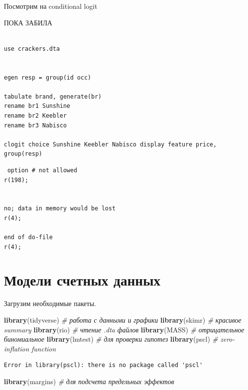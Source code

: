 \documentclass[]{book}
\newenvironment{Shaded}{\begin{snugshade}}{\end{snugshade}}
\newcommand{\CommentTok}[1]{\textcolor[rgb]{0.56,0.35,0.01}{\textit{#1}}}
\newcommand{\KeywordTok}[1]{\textcolor[rgb]{0.13,0.29,0.53}{\textbf{#1}}}
\newcommand{\NormalTok}[1]{#1}
\begin{document}
Посмотрим на conditional logit

ПОКА ЗАБИЛА

\begin{verbatim}

use crackers.dta


egen resp = group(id occ)

tabulate brand, generate(br)
rename br1 Sunshine
rename br2 Keebler
rename br3 Nabisco

clogit choice Sunshine Keebler Nabisco display feature price, group(resp)
\end{verbatim}

\begin{verbatim}
 option # not allowed
r(198);


no; data in memory would be lost
r(4);

end of do-file
r(4);
\end{verbatim}

\hypertarget{poisreg}{%
\chapter{Модели счетных данных}\label{poisreg}}

Загрузим необходимые пакеты.

\begin{Shaded}
\begin{Highlighting}[]
\KeywordTok{library}\NormalTok{(tidyverse) }\CommentTok{# работа с данными и графики}
\KeywordTok{library}\NormalTok{(skimr) }\CommentTok{# красивое summary}
\KeywordTok{library}\NormalTok{(rio) }\CommentTok{# чтение .dta файлов}
\KeywordTok{library}\NormalTok{(MASS) }\CommentTok{# отрицательное биномиальное}
\KeywordTok{library}\NormalTok{(lmtest) }\CommentTok{# для проверки гипотез}
\KeywordTok{library}\NormalTok{(pscl) }\CommentTok{# zero-inflation function}
\end{Highlighting}
\end{Shaded}

\begin{verbatim}
Error in library(pscl): there is no package called 'pscl'
\end{verbatim}

\begin{Shaded}
\begin{Highlighting}[]
\KeywordTok{library}\NormalTok{(margins) }\CommentTok{# для подсчета предельных эффектов}
\end{Highlighting}
\end{Shaded}
\end{document}
